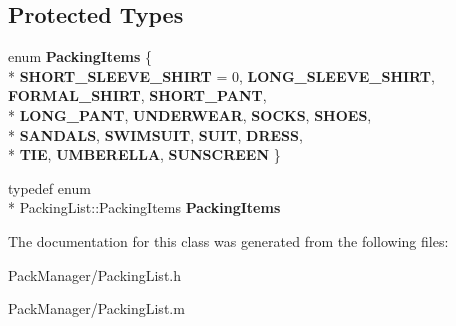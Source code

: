 \subsection*{Protected Types}
\begin{DoxyCompactItemize}
\item 
enum {\bfseries Packing\-Items} \{ \\*
{\bfseries S\-H\-O\-R\-T\-\_\-\-S\-L\-E\-E\-V\-E\-\_\-\-S\-H\-I\-R\-T} = 0, 
{\bfseries L\-O\-N\-G\-\_\-\-S\-L\-E\-E\-V\-E\-\_\-\-S\-H\-I\-R\-T}, 
{\bfseries F\-O\-R\-M\-A\-L\-\_\-\-S\-H\-I\-R\-T}, 
{\bfseries S\-H\-O\-R\-T\-\_\-\-P\-A\-N\-T}, 
\\*
{\bfseries L\-O\-N\-G\-\_\-\-P\-A\-N\-T}, 
{\bfseries U\-N\-D\-E\-R\-W\-E\-A\-R}, 
{\bfseries S\-O\-C\-K\-S}, 
{\bfseries S\-H\-O\-E\-S}, 
\\*
{\bfseries S\-A\-N\-D\-A\-L\-S}, 
{\bfseries S\-W\-I\-M\-S\-U\-I\-T}, 
{\bfseries S\-U\-I\-T}, 
{\bfseries D\-R\-E\-S\-S}, 
\\*
{\bfseries T\-I\-E}, 
{\bfseries U\-M\-B\-E\-R\-E\-L\-L\-A}, 
{\bfseries S\-U\-N\-S\-C\-R\-E\-E\-N}
 \}
\item 
\hypertarget{interface_packing_list_adde267c75d2f559f1878f75e4af0ef58}{typedef enum \\*
Packing\-List\-::\-Packing\-Items {\bfseries Packing\-Items}}\label{interface_packing_list_adde267c75d2f559f1878f75e4af0ef58}

\end{DoxyCompactItemize}


The documentation for this class was generated from the following files\-:\begin{DoxyCompactItemize}
\item 
Pack\-Manager/Packing\-List.\-h\item 
Pack\-Manager/Packing\-List.\-m\end{DoxyCompactItemize}
